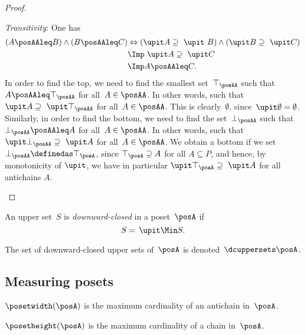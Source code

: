 \begin{proof}
\begin{compactitem}
    \item \emph{Transitivity}: One has
    \begin{equation}
      \begin{aligned}
        \left(A\posAAleq B\right) \wedge \left(B\posAAleq C\right)&\Leftrightarrow  \left(\upit  A \supseteq \ \upit  \ B\right) \wedge \left( \upit   B\supseteq \ \upit  C\right)\\
        &\Imp \ \upit  A\supseteq \ \upit  C\\
        &\Imp A\posAAleq C.
      \end{aligned}
    \end{equation}
    In order to find the top, we need to find the smallest set~$\top_{\posAA}$ such that~$A\posAAleq \top_{\posAA}$ for all~$A\in \posAA$. In other words, such that~$\upit  A\supseteq \ \upit  \top_{\posAA}$ for all~$A\in \posAA$. This is clearly~$\emptyset$, since~$\upit  \emptyset = \emptyset$. Similarly, in order to find the bottom, we need to find the set~$\bot_{\posAA}$ such that~$\bot_{\posAA} \posAAleq A$ for all~$A\in \posAA$. In other words, such that~$\upit  \bot_{\posAA} \supseteq \ \upit  A$ for all~$A\in \posAA$. We obtain a bottom if we set $\bot_{\posAA} \definedas \top_{\posA}$, since $\top_{\posA} \supseteq A$ for all $A \subseteq P$, and hence, by monotonicity of $\upit $, we have in particular $\upit  \top_{\posA} \supseteq \ \upit  A$ for all antichains $A$.
  \end{compactitem}
\end{proof}



\begin{definition}
  \label{def:downward-closed-upperset}
  An upper set~$S$ is \emph{downward-closed} in a poset~$\posA$ if
  \begin{equation}
    S =\, \upit  \Min S.
  \end{equation}
\end{definition}

The set of downward-closed upper sets of~$\posA$ is denoted~$\dcuppersets \posA$.

\subsection{Measuring posets}
\begin{definition}
  \label{def:poset-width} $\posetwidth(\posA)$ is the maximum
  cardinality of an antichain in~$\posA$.
\end{definition}


\begin{definition}
  \label{def:poset-height} $\posetheight(\posA)$
  is the maximum cardinality of a chain in~$\posA$.
\end{definition}

